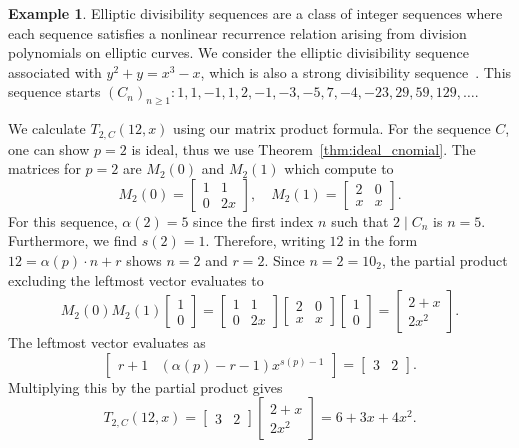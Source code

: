 \documentclass{amsart}
\theoremstyle{definition}
\newtheorem*{example*}{Example}
\newcommand{\seq}[1]{\cite[\href{http://oeis.org/#1}{#1}]{OEIS}}
\begin{document}
\begin{example*}
    Elliptic divisibility sequences are a class of integer sequences where each sequence satisfies a nonlinear recurrence relation arising from division polynomials on elliptic curves. We consider the elliptic divisibility sequence associated with $y^2 + y = x^3 - x$, which is also a strong divisibility sequence~\seq{A006769}.
    This sequence starts $(C_n)_{n\geq1}\colon 1, 1, -1, 1, 2, -1, -3, -5, 7, -4, -23, 29, 59, 129,\ldots$. 

    We calculate $T_{2,C}(12,x)$ using our matrix product formula. For the sequence $C$, one can show $p=2$ is ideal, thus we use Theorem~\ref{thm:ideal_cnomial}. The matrices for $p=2$ are $M_2(0)$ and $M_2(1)$ which compute to 
    $$M_2(0)=\begin{bmatrix}1&1\\0&2x\end{bmatrix}, \quad M_2(1)=\begin{bmatrix}2&0\\x&x\end{bmatrix}.$$ 
    For this sequence, $\alpha(2)=5$ since the first index $n$ such that $2 \mid C_n$ is $n=5$. Furthermore, we find $s(2)=1$. Therefore, writing $12$ in the form $12=\alpha(p)\cdot n+r$ shows $n=2$ and $r=2$. Since $n=2=10_2$, the partial product excluding the leftmost vector evaluates to $$M_2(0)M_2(1)\begin{bmatrix}1\\0\end{bmatrix}=\begin{bmatrix}1&1\\0&2x\end{bmatrix}\begin{bmatrix}2&0\\x&x\end{bmatrix}\begin{bmatrix}1\\0\end{bmatrix}=\begin{bmatrix}2+x\\2x^2\end{bmatrix}.$$ 
The leftmost vector evaluates as $$\begin{bmatrix}
    r+1&(\alpha(p) - r - 1)x^{s(p) - 1}
\end{bmatrix}=\begin{bmatrix}
    3&2
\end{bmatrix}.$$
Multiplying this by the partial product gives $$T_{2,C}(12,x)=\begin{bmatrix}
    3&2
\end{bmatrix}\begin{bmatrix}2+x\\2x^2\end{bmatrix}=6+3x+4x^2.$$ 
\end{example*}
\end{document}
